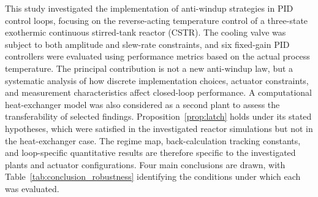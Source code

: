 This study investigated the implementation of anti-windup strategies in PID control loops, focusing on the reverse-acting temperature control of a three-state exothermic continuous stirred-tank reactor (CSTR). The cooling valve was subject to both amplitude and slew-rate constraints, and six fixed-gain PID controllers were evaluated using performance metrics based on the actual process temperature. The principal contribution is not a new anti-windup law, but a systematic analysis of how discrete implementation choices, actuator constraints, and measurement characteristics affect closed-loop performance. A computational heat-exchanger model was also considered as a second plant to assess the transferability of selected findings. Proposition~\ref{prop:latch} holds under its stated hypotheses, which were satisfied in the investigated reactor simulations but not in the heat-exchanger case. The regime map, back-calculation tracking constants, and loop-specific quantitative results are therefore specific to the investigated plants and actuator configurations. Four main conclusions are drawn, with Table~\ref{tab:conclusion_robustness} identifying the conditions under which each was evaluated.


